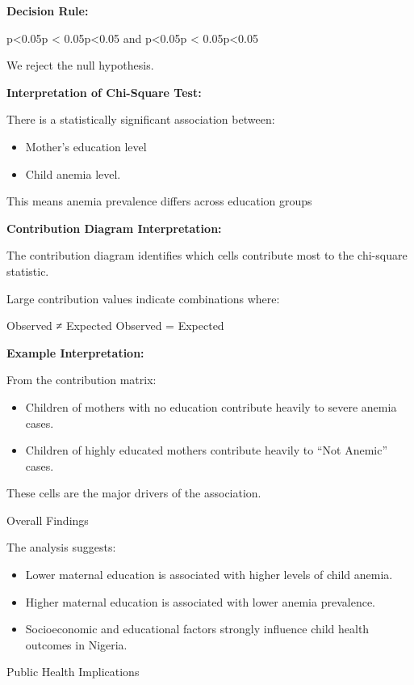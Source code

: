 \documentclass[
]{article}
\begin{document}
\textbf{Decision Rule:}

p\textless0.05p \textless{} 0.05p\textless0.05 and p\textless0.05p
\textless{} 0.05p\textless0.05

We reject the null hypothesis.

\textbf{Interpretation of Chi-Square Test:}

There is a statistically significant association between:

\begin{itemize}
\item
  Mother's education level
\item
  Child anemia level.
\end{itemize}

This means anemia prevalence differs across education groups

\textbf{Contribution Diagram Interpretation:}

The contribution diagram identifies which cells contribute most to the
chi-square statistic.

Large contribution values indicate combinations where:

Observed ≠ Expected Observed = Expected

\textbf{Example Interpretation:}

From the contribution matrix:

\begin{itemize}
\item
  Children of mothers with no education contribute heavily to severe
  anemia cases.
\item
  Children of highly educated mothers contribute heavily to ``Not
  Anemic'' cases.
\end{itemize}

These cells are the major drivers of the association.

Overall Findings

The analysis suggests:

\begin{itemize}
\item
  Lower maternal education is associated with higher levels of child
  anemia.
\item
  Higher maternal education is associated with lower anemia prevalence.
\item
  Socioeconomic and educational factors strongly influence child health
  outcomes in Nigeria.
\end{itemize}

Public Health Implications
\end{document}

